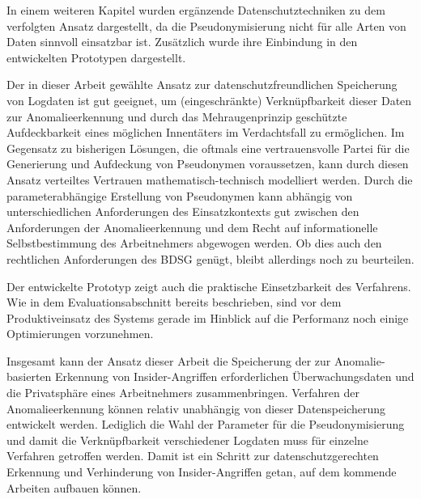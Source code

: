 In einem weiteren Kapitel wurden ergänzende Datenschutztechniken zu dem verfolgten Ansatz dargestellt, da die Pseudonymisierung nicht für alle Arten von Daten sinnvoll einsatzbar ist. Zusätzlich wurde ihre Einbindung in den entwickelten Prototypen dargestellt.

Der in dieser Arbeit gewählte Ansatz zur datenschutzfreundlichen Speicherung von Logdaten ist gut geeignet, um (eingeschränkte) Verknüpfbarkeit dieser Daten zur Anomalieerkennung und durch das Mehraugenprinzip geschützte Aufdeckbarkeit eines möglichen Innentäters im Verdachtsfall zu ermöglichen. Im Gegensatz zu bisherigen Lösungen, die oftmals eine vertrauensvolle Partei für die Generierung und Aufdeckung von Pseudonymen voraussetzen, kann durch diesen Ansatz verteiltes Vertrauen mathematisch-technisch modelliert werden. Durch die parameterabhängige Erstellung von Pseudonymen kann 
abhängig von unterschiedlichen Anforderungen des Einsatzkontexts gut zwischen den Anforderungen der Anomalieerkennung und dem Recht auf informationelle Selbstbestimmung des Arbeitnehmers abgewogen werden. Ob dies auch den rechtlichen Anforderungen des BDSG genügt, bleibt allerdings noch zu beurteilen.

Der entwickelte Prototyp zeigt auch die praktische Einsetzbarkeit des Verfahrens. Wie in dem Evaluationsabschnitt bereits beschrieben, sind vor dem Produktiveinsatz des Systems gerade im Hinblick auf die Performanz noch einige Optimierungen vorzunehmen.

Insgesamt kann der Ansatz dieser Arbeit die Speicherung der zur Anomalie-basierten Erkennung von Insider-Angriffen erforderlichen Überwachungsdaten und die Privatsphäre eines Arbeitnehmers zusammenbringen. Verfahren der Anomalieerkennung können relativ unabhängig von dieser Datenspeicherung entwickelt werden. Lediglich die Wahl der Parameter für die Pseudonymisierung und damit die Verknüpfbarkeit verschiedener Logdaten muss für einzelne Verfahren getroffen werden. Damit ist ein Schritt zur datenschutzgerechten Erkennung und Verhinderung von Insider-Angriffen getan, auf dem kommende Arbeiten aufbauen können.

%

